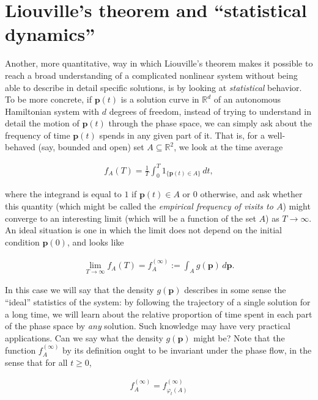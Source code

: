 \documentclass[11pt]{report}
\theoremstyle{plain}
\theoremstyle{definition}
\begin{document}
\section{Liouville's theorem and ``statistical dynamics''}
Another, more quantitative, way in which Liouville's
theorem makes it possible to reach a broad
understanding of a complicated nonlinear system
without being able to describe in detail specific
solutions, is by looking at \emph{statistical} behavior. To
be more concrete, if $\mathbf{p}(t)$ is a solution
curve in $\mathbb{R}^d$ of an autonomous Hamiltonian
system with $d$ degrees of freedom, instead of trying
to understand in detail the motion of $\mathbf{p}(t)$
through the phase space, we can simply ask about the
frequency of time $\mathbf{p}(t)$ spends in any given
part of it. That is, for a well-behaved (say, bounded
and open) set $A \subseteq \mathbb{R}^2$, we look at
the time average

\begin{align*}
f_A(T) = \frac{1}{T} \int_0^T 1_{\{ \mathbf{p}(t) \in A\}}\,dt,
\end{align*}

where the integrand is equal to $1$ if
$\mathbf{p}(t)\in A$ or $0$ otherwise, and ask
whether this quantity (which might be called the
\emph{empirical frequency of visits to $A$}) might
converge to an interesting limit (which will be a
function of the set $A$) as $T\to\infty$. An ideal
situation is one in which the limit does not depend on
the initial condition $\mathbf{p}(0)$, and looks like

\begin{equation*} \tag{20}\label{eq:idealdensity}
\begin{split}
\lim_{T\to\infty} f_A(T) = f_A^{(\infty)} := \int_A g(\mathbf{p})\,d\mathbf{p}.
\end{split}
\end{equation*}

In this case we will say that the density
$g(\mathbf{p})$ describes in some sense the ``ideal''
statistics of the system: by following the trajectory
of a single solution for a long time, we will learn
about the relative proportion of time spent in each
part of the phase space by \emph{any} solution. Such
knowledge may have very practical applications. Can we
say what the density $g(\mathbf{p})$ might be? Note
that the function $f_A^{(\infty)}$ by its definition
ought to be invariant under the phase flow, in the
sense that for all $t\ge 0$,

\begin{align*}
f_A^{(\infty)} = f_{\varphi_t(A)}^{(\infty)}
\end{align*}
\end{document}
